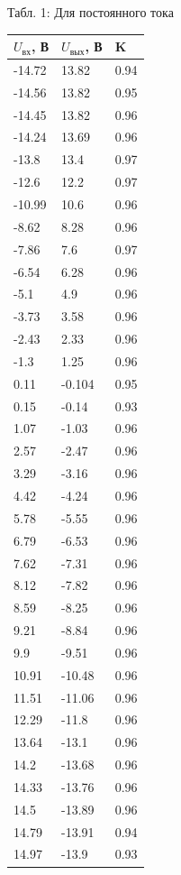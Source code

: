 {Табл. 1: Для постоянного тока

\small
\begin{tabular}{|l|l|l|}
\hline
$U_{вх}$, В & $U_{вых}$, В & K \\
\hline
-14.72&13.82&0.94\\
\hline
-14.56&13.82&0.95\\
\hline
-14.45&13.82&0.96\\
\hline
-14.24&13.69&0.96\\
\hline
-13.8&13.4&0.97\\
\hline
-12.6&12.2&0.97\\
\hline
-10.99&10.6&0.96\\
\hline
-8.62&8.28&0.96\\
\hline
-7.86&7.6&0.97\\
\hline
-6.54&6.28&0.96\\
\hline
-5.1&4.9&0.96\\
\hline
-3.73&3.58&0.96\\
\hline
-2.43&2.33&0.96\\
\hline
-1.3&1.25&0.96\\
\hline
0.11&-0.104&0.95\\
\hline
0.15&-0.14&0.93\\
\hline
1.07&-1.03&0.96\\
\hline
2.57&-2.47&0.96\\
\hline
3.29&-3.16&0.96\\
\hline
4.42&-4.24&0.96\\
\hline
5.78&-5.55&0.96\\
\hline
6.79&-6.53&0.96\\
\hline
7.62&-7.31&0.96\\
\hline
8.12&-7.82&0.96\\
\hline
8.59&-8.25&0.96\\
\hline
9.21&-8.84&0.96\\
\hline
9.9&-9.51&0.96\\
\hline
10.91&-10.48&0.96\\
\hline
11.51&-11.06&0.96\\
\hline
12.29&-11.8&0.96\\
\hline
13.64&-13.1&0.96\\
\hline
14.2&-13.68&0.96\\
\hline
14.33&-13.76&0.96\\
\hline
14.5&-13.89&0.96\\
\hline
14.79&-13.91&0.94\\
\hline
14.97&-13.9&0.93\\
\hline
\end{tabular}}

